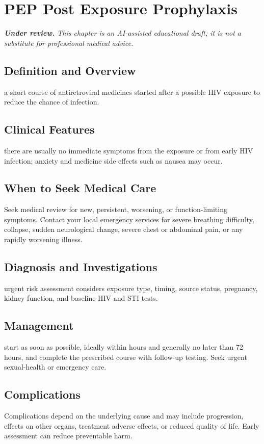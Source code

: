 \chapter{PEP Post Exposure Prophylaxis}

\medskip
\noindent\textit{\textbf{Under review.} This chapter is an AI-assisted educational draft; it is not a substitute for professional medical advice.}

\section*{Definition and Overview}
a short course of antiretroviral medicines started after a possible HIV exposure to reduce the chance of infection.

\section*{Clinical Features}
there are usually no immediate symptoms from the exposure or from early HIV infection; anxiety and medicine side effects such as nausea may occur.

\section*{When to Seek Medical Care}
Seek medical review for new, persistent, worsening, or function-limiting symptoms. Contact your local emergency services for severe breathing difficulty, collapse, sudden neurological change, severe chest or abdominal pain, or any rapidly worsening illness.

\section*{Diagnosis and Investigations}
urgent risk assessment considers exposure type, timing, source status, pregnancy, kidney function, and baseline HIV and STI tests.

\section*{Management}
start as soon as possible, ideally within hours and generally no later than 72 hours, and complete the prescribed course with follow-up testing. Seek urgent sexual-health or emergency care.

\section*{Complications}
Complications depend on the underlying cause and may include progression, effects on other organs, treatment adverse effects, or reduced quality of life. Early assessment can reduce preventable harm.

